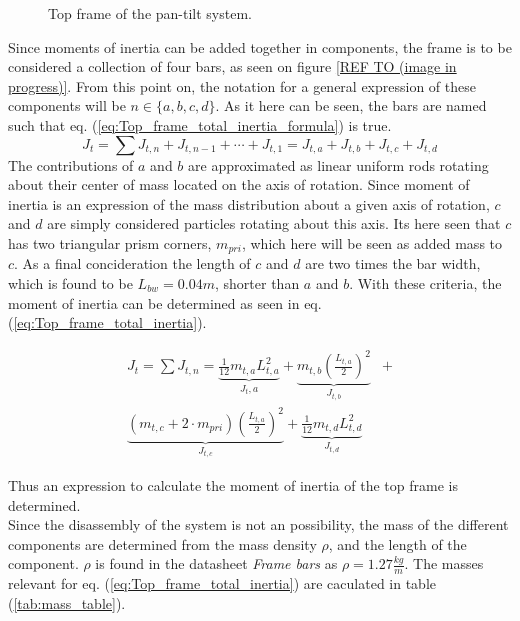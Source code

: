 \documentclass[../../main]{subfiles}
\begin{document}
\begin{figure}[h]
  \label{fig:TopFrame}
  \centering
  
  \caption{Top frame of the pan-tilt system.}
\end{figure}


Since moments of inertia can be added together in components, the frame is to be considered a collection of four bars, as seen on figure \ref{REF TO (image in progress)}. From this point on, the notation for a general expression of these components will be $n \in \{a,b,c,d\}$. As it here can be seen, the bars are named such that eq. (\ref{eq:Top_frame_total_inertia_formula}) is true.
\begin{equation}
  \label{eq:Top_frame_total_inertia_formula}
  J_t = \sum J_{t,n} + J_{t,n-1} + \dotsb + J_{t,1} = J_{t,a} + J_{t,b} + J_{t,c} + J_{t,d}
\end{equation}
The contributions of $a$ and $b$ are approximated as linear uniform rods rotating about their center of mass located on the axis of rotation. Since moment of inertia is an expression of the mass distribution about a given axis of rotation, $c$ and $d$ are simply considered particles  rotating about this axis. Its here seen that $c$ has two triangular prism corners, $m_{pri}$, which here will be seen as added mass to $c$. As a final concideration the length of $c$ and $d$ are two times the bar width, which is found to be $L_{bw} = 0.04m$, shorter than $a$ and $b$. With these criteria, the moment of inertia can be determined as seen in eq. (\ref{eq:Top_frame_total_inertia}).

\begin{equation}
  \label{eq:Top_frame_total_inertia}
\begin{split}
  J_t = \sum J_{t,n} =
  \underbrace{\frac{1}{12}m_{t,a}L_{t,a}^2}_\text{$J_t,a$} +
  \underbrace{m_{t,b}\left(\frac{L_{t,a}}{2}\right)^2}_\text{$J_{t,b}$} &+ \\
  \underbrace{(m_{t,c} + 2\cdot m_{pri})\left(\frac{L_{t,a}}{2}\right)^2}_\text{$J_{t,c}$} +
  \underbrace{\frac{1}{12}m_{t,d}L_{t,d}^2}_\text{$J_{t,d}$}
\end{split}
\end{equation}

Thus an expression to calculate the moment of inertia of the top frame is determined.\\

Since the disassembly of the system is not an possibility, the mass of the different components are determined from the mass density $\rho$, and the length of the component. $\rho$ is found in the datasheet \textit{Frame bars} as $\rho = 1.27 \frac{kg}{m}$. The masses relevant for eq. (\ref{eq:Top_frame_total_inertia}) are caculated in table (\ref{tab:mass_table}).
\end{document}
